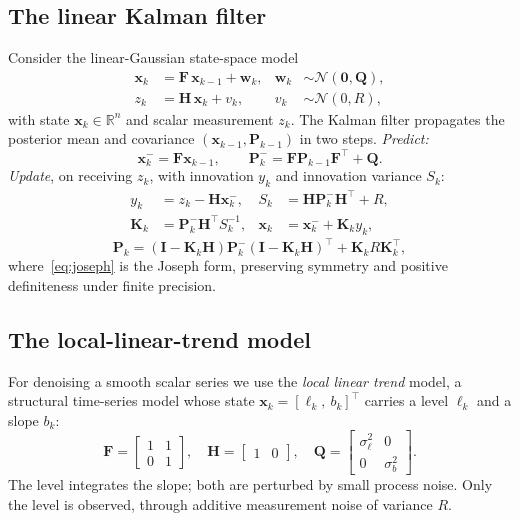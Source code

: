 \documentclass[10pt,twocolumn]{article}
\newcommand{\vx}{\mathbf{x}}
\newcommand{\mF}{\mathbf{F}}
\newcommand{\mH}{\mathbf{H}}
\newcommand{\mP}{\mathbf{P}}
\newcommand{\mQ}{\mathbf{Q}}
\newcommand{\mK}{\mathbf{K}}
\newcommand{\mI}{\mathbf{I}}
\newcommand{\Rmeas}{R}
\begin{document}
\subsection{The linear Kalman filter}
Consider the linear-Gaussian state-space model
\begin{align}
\vx_k &= \mF\,\vx_{k-1} + \mathbf{w}_k, & \mathbf{w}_k &\sim \mathcal{N}(\mathbf{0},\mQ),\\
z_k   &= \mH\,\vx_k + v_k, & v_k &\sim \mathcal{N}(0,\Rmeas),
\end{align}
with state $\vx_k\in\mathbb{R}^n$ and scalar measurement $z_k$. The Kalman filter
propagates the posterior mean and covariance $(\vx_{k-1},\mP_{k-1})$ in two steps.
\emph{Predict:}
\begin{equation}
\vx_k^- = \mF\vx_{k-1}, \qquad \mP_k^- = \mF\mP_{k-1}\mF^\top + \mQ.
\end{equation}
\emph{Update}, on receiving $z_k$, with innovation $y_k$ and innovation variance
$S_k$:
\begin{align}
y_k &= z_k - \mH\vx_k^-, & S_k &= \mH\mP_k^-\mH^\top + \Rmeas,\\
\mK_k &= \mP_k^-\mH^\top S_k^{-1}, & \vx_k &= \vx_k^- + \mK_k y_k,
\end{align}
\begin{equation}
\mP_k = (\mI-\mK_k\mH)\mP_k^-(\mI-\mK_k\mH)^\top + \mK_k \Rmeas \mK_k^\top,
\label{eq:joseph}
\end{equation}
where~\eqref{eq:joseph} is the Joseph form, preserving symmetry and positive
definiteness under finite precision.

\subsection{The local-linear-trend model}
For denoising a smooth scalar series we use the \emph{local linear trend} model,
a structural time-series model whose state $\vx_k = [\ell_k,\ b_k]^\top$ carries a
level $\ell_k$ and a slope $b_k$:
\begin{equation}
\mF = \begin{bmatrix}1 & 1\\ 0 & 1\end{bmatrix},\quad
\mH = \begin{bmatrix}1 & 0\end{bmatrix},\quad
\mQ = \begin{bmatrix}\sigma_\ell^2 & 0\\ 0 & \sigma_b^2\end{bmatrix}.
\end{equation}
The level integrates the slope; both are perturbed by small process noise. Only
the level is observed, through additive measurement noise of variance $\Rmeas$.
\end{document}
